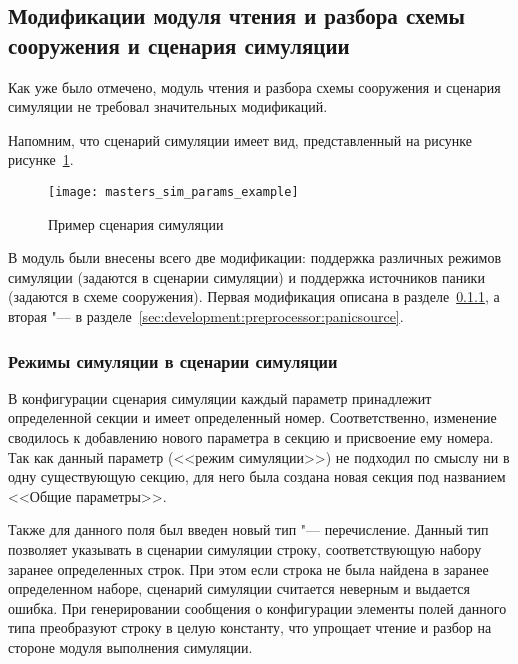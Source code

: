 \subsection{Модификации модуля чтения и разбора схемы сооружения и сценария симуляции}
\label{sec:development:preprocessor}

Как уже было отмечено, модуль чтения и разбора схемы сооружения и сценария симуляции не требовал значительных модификаций.

Напомним, что сценарий симуляции имеет вид, представленный на рисунке рисунке~\ref{sec:development:preprocessor:scenario_dsl_listing}.

\begin{figure}[ht!]
  \centering
  \texttt{[image: masters\_sim\_params\_example]}
  \caption{Пример сценария симуляции}
  \label{sec:development:preprocessor:scenario_dsl_listing}
\end{figure}

В модуль были внесены всего две модификации: поддержка различных режимов симуляции (задаются в сценарии симуляции) и поддержка источников паники (задаются в схеме сооружения).
Первая модификация описана в разделе~\ref{sec:development:preprocessor:escape}, а вторая "--- в разделе~\ref{sec:development:preprocessor:panicsource}.

\subsubsection{Режимы симуляции в сценарии симуляции}
\label{sec:development:preprocessor:escape}

В конфигурации сценария симуляции каждый параметр принадлежит определенной секции и имеет определенный номер.
Соответственно, изменение сводилось к добавлению нового параметра в секцию и присвоение ему номера.
Так как данный параметр (<<режим симуляции>>) не подходил по смыслу ни в одну существующую секцию,
для него была создана новая секция под названием <<Общие параметры>>.

Также для данного поля был введен новый тип "--- перечисление.
Данный тип позволяет указывать в сценарии симуляции строку, соответствующую набору заранее определенных строк.
При этом если строка не была найдена в заранее определенном наборе, сценарий симуляции считается неверным и выдается ошибка.
При генерировании сообщения о конфигурации элементы полей данного типа преобразуют строку в целую константу, что упрощает чтение и разбор на стороне модуля выполнения симуляции.

